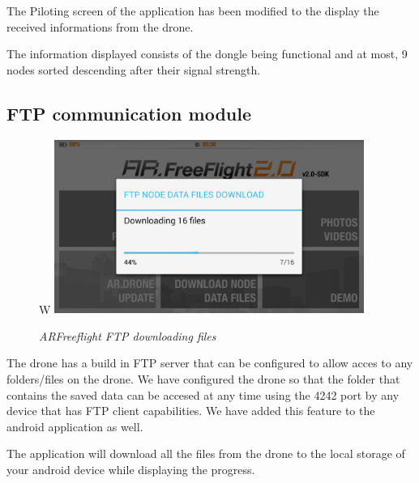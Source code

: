 The Piloting screen of the application has been modified to the display the received informations from the drone. 

The information displayed consists of the dongle being functional and at most, 9 nodes sorted descending after their signal strength. 
  
\subsection{FTP communication module}

\begin{figure}[ht]
\begin{center}W
\includegraphics[width=0.9\textwidth]{implementation/android_ftp.png}
\end{center}
\caption{\small \itshape{ARFreeflight FTP downloading files}}
\end{figure}

The drone has a build in FTP server that can be configured to allow acces to any folders/files on the drone. We have configured the drone so that the folder that contains the saved data can be accesed at any time using the 4242 port by any device that has FTP client capabilities. We have added this feature to the android application as well.

The application will download all the files from the drone to the local storage of your android device while displaying the progress.
 

